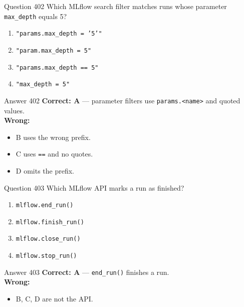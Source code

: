 \documentclass[aspectratio=169,11pt]{beamer}
\begin{document}
	\begin{frame}{Question 402}
		Which MLflow search filter matches runs whose parameter \texttt{max\_depth} equals 5?
		\begin{enumerate}[label=\Alph*.]
			\item \texttt{"params.max\_depth = '5'"}
			\item \texttt{"param.max\_depth = 5"}
			\item \texttt{"params.max\_depth == 5"}
			\item \texttt{"max\_depth = 5"}
		\end{enumerate}
	\end{frame}
	\begin{frame}{Answer 402}
		\textbf{Correct: A} --- parameter filters use \texttt{params.<name>} and quoted values.\\
		\vspace{0.5em}
		\textbf{Wrong:}
		\begin{itemize}
			\item B uses the wrong prefix.
			\item C uses \texttt{==} and no quotes.
			\item D omits the prefix.
		\end{itemize}
	\end{frame}
	
	\begin{frame}{Question 403}
		Which MLflow API marks a run as finished?
		\begin{enumerate}[label=\Alph*.]
			\item \texttt{mlflow.end\_run()}
			\item \texttt{mlflow.finish\_run()}
			\item \texttt{mlflow.close\_run()}
			\item \texttt{mlflow.stop\_run()}
		\end{enumerate}
	\end{frame}
	\begin{frame}{Answer 403}
		\textbf{Correct: A} --- \texttt{end\_run()} finishes a run.\\
		\vspace{0.5em}
		\textbf{Wrong:}
		\begin{itemize}
			\item B, C, D are not the API.
		\end{itemize}
	\end{frame}
	
\end{document}

